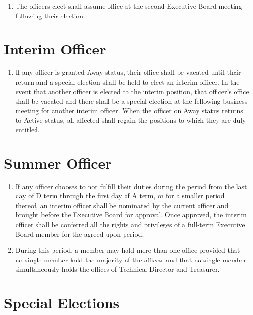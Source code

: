 \documentclass[12pt,letterpaper]{book}
\begin{document}
\begin{enumerate}
\item The officers-elect shall assume office at the second Executive Board meeting following their election.

\end{enumerate}

\section{Interim Officer}

\begin{enumerate}

\item If any officer is granted Away status, their office shall be vacated until their return and a special election shall be held to elect an interim officer. In the event that another officer is elected to the interim position, that officer’s office shall be vacated and there shall be a special election at the following business meeting for another interim officer. When the officer on Away status returns to Active status, all affected shall regain the positions to which they are duly entitled.

\end{enumerate}

\section{Summer Officer} \label{sec:summerofficer}

\begin{enumerate}

\item If any officer chooses to not fulfill their duties during the period from the last day of D term through the first day of A term, or for a smaller period thereof, an interim officer shall be nominated by the current officer and brought before the Executive Board for approval. Once approved, the interim officer shall be conferred all the rights and privileges of a full-term Executive Board member for the agreed upon period.
\item During this period, a member may hold more than one office provided that no single member hold the majority of the offices, and that no single member simultaneously holds the offices of Technical Director and Treasurer.

\end{enumerate}

\section{Special Elections} \label{sec:specialelections}
\end{document}
